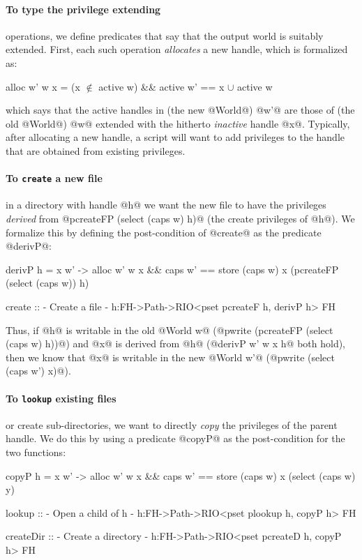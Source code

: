 \paragraph{To type the privilege extending} operations, we define 
predicates that say that the output world is suitably 
extended. First, each such operation \emph{allocates} 
a new handle, which is formalized as:
%
\begin{mcode}
  alloc w' w x = 
    (x $\not \in$ active w) && active w' == {x} $\cup$ active w
\end{mcode}
%
which says that the active handles in (the new @World@) 
@w'@ are those of (the old @World@) @w@ extended with the
hitherto \emph{inactive} handle @x@.
%
Typically, after allocating a new handle, a script will
want to add privileges to the handle that are obtained
from existing privileges.

\paragraph{To \texttt{create} a new file} in a directory with handle @h@ we
want the new file to have the privileges \emph{derived} from
@pcreateFP (select (caps w) h)@ (\ie the create privileges of @h@). We
formalize this by defining the post-condition of @create@ as the predicate @derivP@:
%
\begin{code}
  derivP h  = \w x w' -> 
    alloc w' w x && 
    caps w' == store (caps w) x 
                  (pcreateFP (select (caps w)) h)

  create :: {- Create a file -}
    h:FH->Path->RIO<pset pcreateF h, derivP h> FH
\end{code}
%
Thus, if @h@ is writable in the old @World w@ 
(@pwrite (pcreateFP (select (caps w) h))@) and
@x@ is derived from @h@ (@derivP w' w x h@ both hold),
then we know that @x@ is writable in the new @World w'@
(@pwrite (select (caps w') x)@).

\paragraph{To \texttt{lookup} existing files} or create sub-directories,
we want to directly \emph{copy} the privileges of the parent handle. 
We do this by using a predicate @copyP@ as the post-condition for 
the two functions:
%
\begin{code}
  copyP h = \w x w' ->
    alloc w' w x && 
    caps w' == store (caps w) x 
                     (select (caps w) y)

  lookup :: {- Open a child of h -}
    h:FH->Path->RIO<pset plookup h, copyP h> FH

  createDir :: {- Create a directory -}
    h:FH->Path->RIO<pset pcreateD h, copyP h> FH
\end{code}
  
